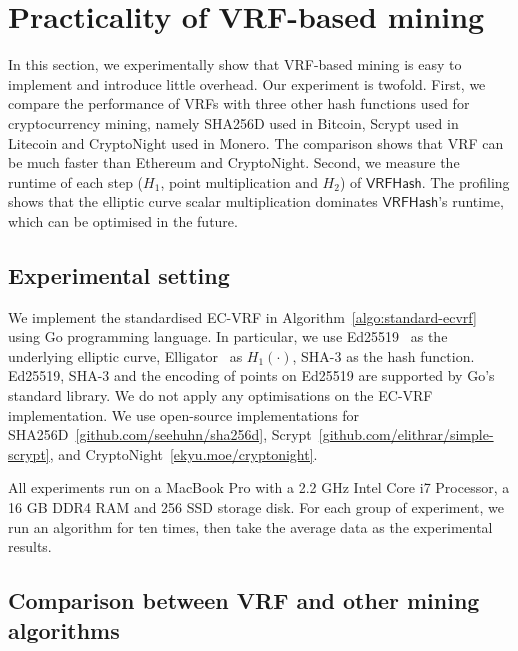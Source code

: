 \section{Practicality of VRF-based mining}
\label{sec:practicality}

In this section, we experimentally show that VRF-based mining is easy to implement and introduce little overhead.
Our experiment is twofold.
First, we compare the performance of VRFs with three other hash functions used for cryptocurrency mining, namely SHA256D used in Bitcoin, Scrypt used in Litecoin and CryptoNight used in Monero.
The comparison shows that VRF can be much faster than Ethereum and CryptoNight.
Second, we measure the runtime of each step ($H_1$, point multiplication and $H_2$) of $\mathsf{VRFHash}$.
The profiling shows that the elliptic curve scalar multiplication dominates $\mathsf{VRFHash}$'s runtime, which can be optimised in the future.

\subsection{Experimental setting}

We implement the standardised EC-VRF in Algorithm~\ref{algo:standard-ecvrf} using Go programming language.
In particular, we use Ed25519~\cite{bernstein2012high} as the underlying elliptic curve, Elligator~\cite{bernstein2013elligator} as $H_1(\cdot)$, SHA-3 as the hash function.
Ed25519, SHA-3 and the encoding of points on Ed25519 are supported by Go's standard library.
We do not apply any optimisations on the EC-VRF implementation.
We use open-source implementations for SHA256D~\ref{github.com/seehuhn/sha256d}, Scrypt~\ref{github.com/elithrar/simple-scrypt}, and CryptoNight~\ref{ekyu.moe/cryptonight}.

All experiments run on a MacBook Pro with a 2.2 GHz Intel Core i7 Processor, a 16 GB DDR4 RAM and 256 SSD storage disk.
For each group of experiment, we run an algorithm for ten times, then take the average data as the experimental results.




\subsection{Comparison between VRF and other mining algorithms}

